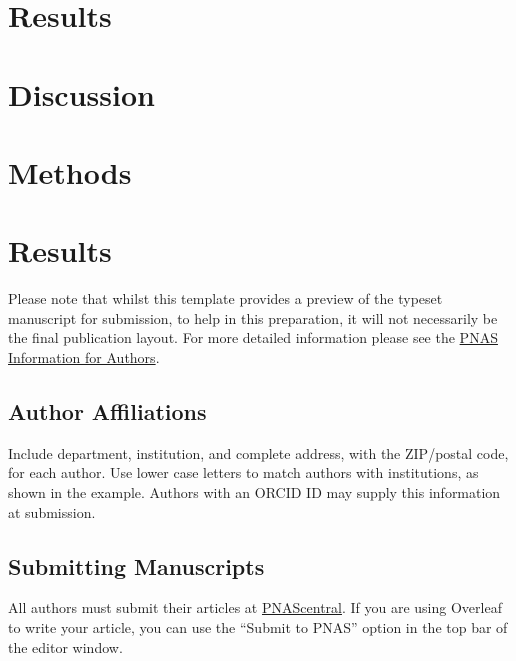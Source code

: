 \documentclass[9pt,twocolumn,twoside,]{pnas-new}
\begin{document}
\section*{Results}\label{results}

\section*{Discussion}\label{discussion}

\section*{Methods}\label{methods}

\section*{Results}\label{results-1}

Please note that whilst this template provides a preview of the typeset
manuscript for submission, to help in this preparation, it will not
necessarily be the final publication layout. For more detailed
information please see the
\href{http://www.pnas.org/site/authors/format.xhtml}{PNAS Information
for Authors}.

\subsection*{Author Affiliations}\label{author-affiliations}

Include department, institution, and complete address, with the
ZIP/postal code, for each author. Use lower case letters to match
authors with institutions, as shown in the example. Authors with an
ORCID ID may supply this information at submission.

\subsection*{Submitting Manuscripts}\label{submitting-manuscripts}

All authors must submit their articles at
\href{http://www.pnascentral.org/cgi-bin/main.plex}{PNAScentral}. If you
are using Overleaf to write your article, you can use the ``Submit to
PNAS'' option in the top bar of the editor window.
\end{document}
